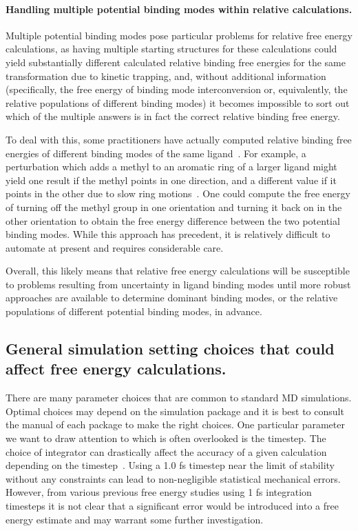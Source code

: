 \documentclass[9pt,bestpractices]{livecoms}
\begin{document}
\paragraph{Handling multiple potential binding modes within relative calculations.}
Multiple potential binding modes pose particular problems for relative free energy calculations, as having multiple starting structures for these calculations could yield substantially different calculated relative binding free energies for the same transformation due to kinetic trapping, and, without additional information (specifically, the free energy of binding mode interconversion or, equivalently, the relative populations of different binding modes) it becomes impossible to sort out which of the multiple answers is in fact the correct relative binding free energy.

To deal with this, some practitioners have actually computed relative binding free energies of different binding modes of the same ligand~\cite{palma2012computation}.
For example, a perturbation which adds a methyl to an aromatic ring of a larger ligand might yield one result if the methyl points in one direction, and a different value if it points in the other due to slow ring motions~\cite{lincoff2016comparing, sasmal2020sampling}.
One could compute the free energy of turning off the methyl group in one orientation and turning it back on in the other orientation to obtain the free energy difference between the two potential binding modes.
While this approach has precedent, it is relatively difficult to automate at present and requires considerable care.

Overall, this likely means that relative free energy calculations will be susceptible to problems resulting from uncertainty in ligand binding modes until more robust approaches are available to determine dominant binding modes, or the relative populations of different potential binding modes, in advance.

\subsection{General simulation setting choices that could affect free energy calculations.}
There are many parameter choices that are common to standard MD simulations. Optimal choices may depend on the simulation package and it is best to consult the manual of each package to make the right choices. One particular parameter we want to draw attention to which is often overlooked is the timestep. The choice of integrator can drastically affect the accuracy of a given calculation depending on the timestep~\cite{leimkuhler2016efficient}. Using a 1.0 fs timestep near the limit of stability without any constraints can lead to non-negligible statistical mechanical errors. However, from various previous free energy studies using 1 fs integration timesteps it is not clear that a significant error would be introduced into a free energy estimate and may warrant some further investigation.  
\end{document}
